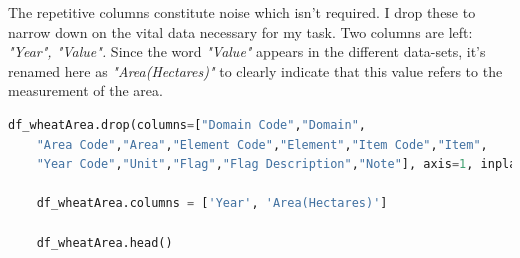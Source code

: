 The repetitive columns constitute noise which isn't required. I drop these to narrow down on the vital data necessary for my task. Two columns are left: \textit{"Year", "Value".} Since the word \textit{"Value"} appears in the different data-sets, it's renamed here as \textit{"Area(Hectares)"} to clearly indicate that this value refers to the measurement of the area.


\begin{lstlisting}[language=Python]
	df_wheatArea.drop(columns=["Domain Code","Domain",
	"Area Code","Area","Element Code","Element","Item Code","Item",
	"Year Code","Unit","Flag","Flag Description","Note"], axis=1, inplace=True)
	
	df_wheatArea.columns = ['Year', 'Area(Hectares)'] 
	
	df_wheatArea.head()
\end{lstlisting}

